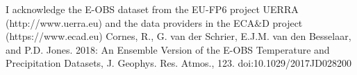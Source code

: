 
I acknowledge the E-OBS dataset from the EU-FP6 project UERRA (http://www.uerra.eu) and the data providers in the ECA\&D project (https://www.ecad.eu)
Cornes, R., G. van der Schrier, E.J.M. van den Besselaar, and P.D. Jones. 2018: An Ensemble Version of the E-OBS Temperature and Precipitation Datasets, J. Geophys. Res. Atmos., 123. doi:10.1029/2017JD028200

